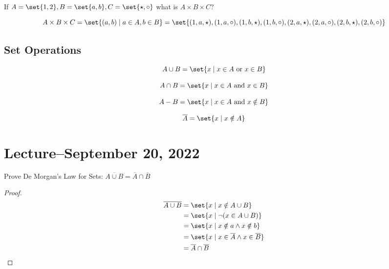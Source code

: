 \documentclass[8pt]{scrreprt}
\begin{document}
\begin{landscape}
\begin{multicols*}{3}
\begin{example}
	If $A=\set{1, 2}, B=\set{a, b}, C=\set{\star, \circ}$ what is $A\times B\times C$?

	\[
		A\times B\times C = \set{(a,b)\mid a\in A, b\in B} = \set{(1,a,\star), (1,a,\circ), (1,b,\star), (1,b,\circ), (2,a,\star), (2,a,\circ), (2,b,\star), (2,b,\circ)}
	\]
\end{example}

\subsection{Set Operations}

\begin{definition}
	\[
		A \cup B = \set{x\mid x\in A \text{ or } x\in B}
	\]
\end{definition}

\begin{definition}[Intersection]
	\[
		A \cap B = \set{x\mid x\in A \text{ and } x\in B}
	\]
\end{definition}

\begin{definition}[Difference]
	\[
		A - B = \set{x\mid x\in A \text{ and } x\notin B}
	\]
\end{definition}

\begin{definition}[Complement]
	\[
		\overline{A} = \set{x\mid x\notin A}
	\]
\end{definition}

\section{Lecture--September 20, 2022}

Prove De Morgan's Law for Sets: $\overline{A\cup B} = \overline{A}\cap \overline{B}$

\begin{proof}
	\begin{align}
		\overline{A\cup B} &= \set{x\mid x\notin A\cup B} \\
						   &= \set{x \mid \neg(x\in A\cup B)} \\
						   &= \set{x \mid x \notin a \land x\notin b} \\
						   &= \set{x \mid x \in \overline{A} \land x\in \overline{B}} \\
		                   &= \overline{A}\cap \overline{B}
	\end{align}
\end{proof}


\end{multicols*}
\end{landscape}
\end{document}
